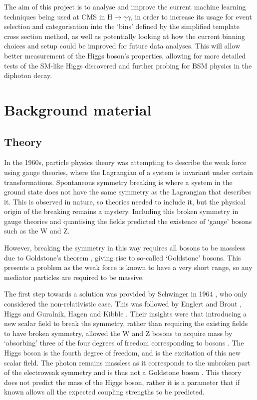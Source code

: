 \documentclass[12pt]{article}
\begin{document}
The aim of this project is to analyse and improve the current machine learning techniques being used at CMS in H$\rightarrow \gamma\gamma$, in order to increase its usage for event selection and categorisation into the `bins' defined by the simplified template cross section method, as well as potentially looking at how the current binning choices and setup could be improved for future data analyses. This will allow better measurement of the Higgs boson's properties, allowing for more detailed tests of the SM-like Higgs discovered and further probing for BSM physics in the diphoton decay. 

\section*{Background material}

\subsection*{Theory}

In the 1960s, particle physics theory was attempting to describe the weak force using gauge theories, where the Lagrangian of a system is invariant under certain transformations. Spontaneous symmetry breaking is where a system in the ground state does not have the same symmetry as the Lagrangian that describes it. This is observed in nature, so theories needed to include it, but the physical origin of the breaking remains a mystery. Including this broken symmetry in gauge theories and quantising the fields predicted the existence of `gauge' bosons such as the W and Z. 

However, breaking the symmetry in this way requires all bosons to be massless due to Goldstone's theorem \cite{higgstheory}, giving rise to so-called `Goldstone' bosons. This presents a problem as the weak force is known to have a very short range, so any mediator particles are required to be massive.

The first step towards a solution was provided by Schwinger in 1964 \cite{theory1}, who only considered the non-relativistic case. This was followed by Englert and Brout \cite{theory2}, Higgs \cite{higgstheory} and Guralnik, Hagen and Kibble \cite{theory3}. Their insights were that introducing a new scalar field to break the symmetry, rather than requiring the existing fields to have broken symmetry, allowed the W and Z bosons to acquire mass by `absorbing' three of the four degrees of freedom corresponding to bosons \cite{theory4}. The Higgs boson is the fourth degree of freedom, and is the excitation of this new scalar field. The photon remains massless as it corresponds to the unbroken part of the electroweak symmetry and is thus not a Goldstone boson \cite{theory5}. This theory does not predict the mass of the Higgs boson, rather it is a parameter that if known allows all the expected coupling strengths to be predicted. 
\end{document}
